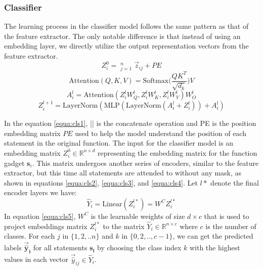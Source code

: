 \documentclass{ieeeaccess}
\DeclareMathOperator*{\concat}{||}
\begin{document}
\subsubsection{Classifier} \label{sec:classifier}

\par The learning process in the classifier model follows the same pattern as that of the feature extractor. The only notable difference is that instead of using an embedding layer, we directly utilize the output representation vectors from the feature extractor.  
\begin{equation}\label{equa:cls1}
Z^0_{i}=\concat_{j=1}^{n}\Vec{z}_{ij} + PE\end{equation}
\begin{equation}\label{equa:cls2}
\text{Attention}(Q,K,V) = \text{Softmax}\bigg(\frac{QK^T}{\sqrt{d_k}}\bigg) V\end{equation}
\begin{equation}\label{equa:cls3}
A_{i}^{l} = \text{Attention}(Z_{i}^lW_Q^l, Z_{i}^lW_K^l, Z_{i}^lW_V^l)W^l_O
\end{equation}
\begin{equation}\label{equa:cls4}
Z_{i}^{l+1} = \text{LayerNorm}(\text{MLP}( \text{LayerNorm}(A_{i}^{l} +Z_{i}^l))+ A_{i}^l)\end{equation}
\par In the equation \ref{equa:cls1},  || is the concatenate operation and PE is the position embedding matrix $PE$ used to help the model understand the position of each statement in the original function. The input for the classifier model is an embedding matrix $Z^0_{i} \in \mathbb{R}^{n \times d}$ representing the embedding matrix for the function gadget $\mathbf{s}_i$. This matrix undergoes another series of encoders, similar to the feature extractor, but this time all statements are attended to without any mask, as shown in equations \ref{equa:cls2}, \ref{equa:cls3}, and \ref{equa:cls4}. Let $l*$ denote the final encoder layers we have:
\begin{equation} \label{equa:cls5} \hat{Y}_i= \text{Linear}(Z_{i}^{l*}) = W^CZ_{i}^{l*} \end{equation}
In equation \ref{equa:cls5}, $W^C$ is the learnable weights of size $d \times c$ that is used to project embeddings matrix  $Z_{i}^{l*}$ to the matrix $\hat{Y}_i \in \mathbb{R}^{n \times c}$ where $c$ is the number of classes. For each $j$ in $\{1,2,..n\}$ and $k$ in $\{0,2,..,c-1\}$, we can get the predicted labels $\mathbf{\Vec{\hat{y}}_i}$ for all statements $\mathbf{s_i}$ by choosing the class index $k$ with the highest values in each vector $\Vec{\hat{y}}_{ij} \in \hat{Y}_i$.
\end{document}
